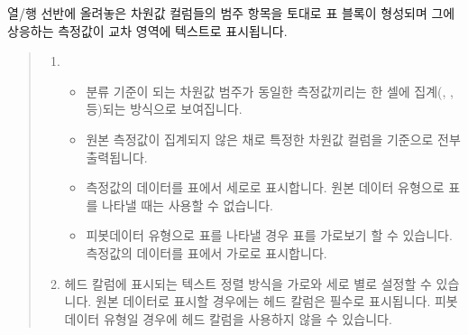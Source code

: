 \documentclass[letterpaper,10pt,english]{sphinxmanual}
\begin{document}

열/행 선반에 올려놓은 차원값 컬럼들의 범주 항목을 토대로 표 블록이 형성되며 그에 상응하는 측정값이 교차 영역에 텍스트로 표시됩니다.
\begin{quote}

\begin{figure}[H]
\centering

\noindent{}
\end{figure}
\begin{enumerate}
\def\theenumi{\arabic{enumi}}
\def\labelenumi{\theenumi .}
\makeatletter\def\p@enumii{\p@enumi \theenumi .}\makeatother
\item {} 
\begin{itemize}
\item {} 
 분류 기준이 되는 차원값 범주가 동일한 측정값끼리는 한 셀에 집계(, ,  등)되는 방식으로 보여집니다.

\item {} 
 원본 측정값이 집계되지 않은 채로 특정한 차원값 컬럼을 기준으로 전부 출력됩니다.

\item {} 
 측정값의 데이터를 표에서 세로로 표시합니다. 원본 데이터 유형으로 표를 나타낼 때는 사용할 수 없습니다.

\item {} 
 피봇데이터 유형으로 표를 나타낼 경우 표를 가로보기 할 수 있습니다. 측정값의 데이터를 표에서 가로로 표시합니다.

\end{itemize}

\item {} 
 헤드 칼럼에 표시되는 텍스트 정렬 방식을 가로와 세로 별로 설정할 수 있습니다. 원본 데이터로 표시할 경우에는 헤드 칼럼은 필수로 표시됩니다. 피봇 데이터 유형일 경우에 헤드 칼럼을 사용하지 않을 수 있습니다.

\end{enumerate}
\end{quote}

\end{document}

